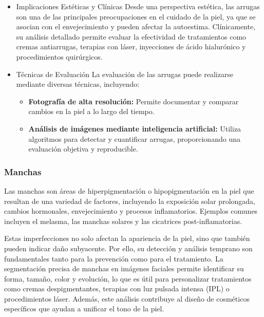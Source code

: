\begin{itemize}
\begin{itemize}
\end{itemize}
\item Implicaciones Estéticas y Clínicas
Desde una perspectiva estética, las arrugas son una de las principales preocupaciones en el cuidado de la piel, ya que se asocian con el envejecimiento y pueden afectar la autoestima. Clínicamente, su análisis detallado permite evaluar la efectividad de tratamientos como cremas antiarrugas, terapias con láser, inyecciones de ácido hialurónico y procedimientos quirúrgicos. \parencite{moon2024dermatology}

\item Técnicas de Evaluación
La evaluación de las arrugas puede realizarse mediante diversas técnicas, incluyendo:
\begin{itemize} 
\item \textbf{Fotografía de alta resolución:} Permite documentar y comparar cambios en la piel a lo largo del tiempo. \parencite{yoon2023}

\item \textbf{Análisis de imágenes mediante inteligencia artificial:} Utiliza algoritmos para detectar y cuantificar arrugas, proporcionando una evaluación objetiva y reproducible. \parencite{yoon2023}
\end{itemize}
\end{itemize}

\subsubsection{Manchas}
Las manchas son áreas de hiperpigmentación o hipopigmentación en la piel que resultan de una variedad de factores, incluyendo la exposición solar prolongada, cambios hormonales, envejecimiento y procesos inflamatorios. Ejemplos comunes incluyen el melasma, las manchas solares y las cicatrices post-inflamatorias. \parencite{autor2019manchas}

Estas imperfecciones no solo afectan la apariencia de la piel, sino que también pueden indicar daño subyacente. Por ello, su detección y análisis temprano son fundamentales tanto para la prevención como para el tratamiento. La segmentación precisa de manchas en imágenes faciales permite identificar su forma, tamaño, color y evolución, lo que es útil para personalizar tratamientos como cremas despigmentantes, terapias con luz pulsada intensa (IPL) o procedimientos láser. Además, este análisis contribuye al diseño de cosméticos específicos que ayudan a unificar el tono de la piel. \parencite{autor2019manchas}

